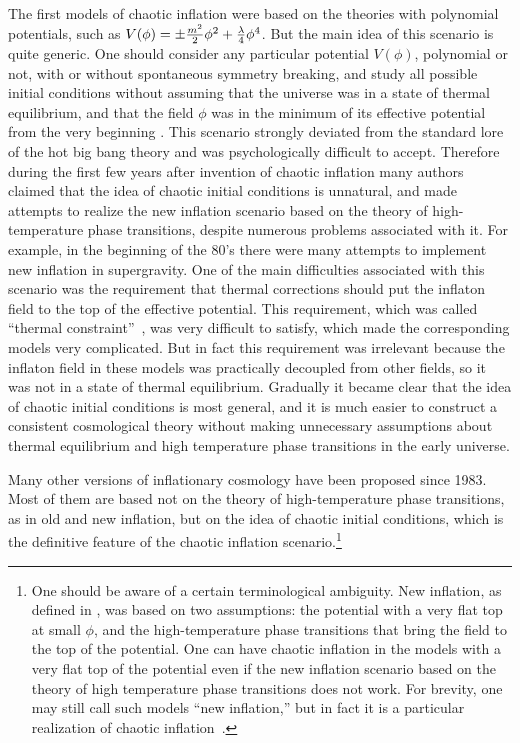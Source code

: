 \documentclass[a4paper,12pt]{article}
\begin{document}
The first models of chaotic inflation were based on the theories with
polynomial potentials, such as $V(\phi) = \pm {m^2\over 2} \phi^2
+{\lambda\over 4} \phi^4$. But the main idea of this scenario is quite
generic. One should consider any particular potential $V(\phi)$,
polynomial or not, with or without spontaneous symmetry breaking, and
study all possible initial conditions without assuming that the universe
was in a state of thermal equilibrium, and that the field $\phi$ was in
the minimum of its effective potential from the very beginning
\cite{Chaot}. This scenario strongly deviated from the standard lore of
the hot big bang theory and was psychologically difficult to accept.
Therefore during the first few years after invention of chaotic inflation
many authors claimed that the idea of chaotic initial conditions is
unnatural, and made attempts to realize the new inflation scenario based
on the theory of high-temperature phase transitions, despite numerous
problems associated with it. For example, in the beginning of the 80's there were many attempts to implement new inflation in supergravity. One of the main difficulties associated with this scenario was the requirement that thermal corrections should put the inflaton field to the top of the effective potential. This requirement, which was called ``thermal constraint''~\cite{OvrutSteinhardt}, was very difficult to satisfy, which made the corresponding models very complicated. But in fact this requirement was  irrelevant because the inflaton field in these models was practically decoupled from other fields, so it was not in a state of thermal equilibrium.  Gradually  it became clear that the
idea of chaotic initial conditions is most general, and   it is much
easier to construct a consistent cosmological theory without making
unnecessary assumptions about thermal equilibrium and high temperature
phase transitions in the early universe.


Many other versions of inflationary cosmology have been proposed since
1983. Most of them are based not  on the  theory of high-temperature
phase transitions, as in old and new inflation, but on the idea of
chaotic initial conditions, which is the definitive feature of the
chaotic inflation scenario.\footnote{One should be aware of a certain terminological ambiguity. New inflation, as defined in \cite{New}, was based on two assumptions:  the potential with a very flat top at small $\phi$, and the high-temperature phase transitions that bring the field to the top of the potential.  One can have chaotic inflation in the models with a very flat top of the potential even if the new inflation scenario based on the theory of high temperature phase transitions does not work. For brevity, one may still call such models ``new inflation,'' but in fact it is a particular realization of chaotic inflation~\cite{primordial}. }
\end{document}
